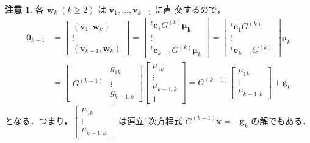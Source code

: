 \documentclass[11pt, uplatex, dvipdfmx]{jsarticle}
\theoremstyle{definition}
\newtheorem*{remark}{注意}
\begin{document}
\begin{remark}
  各 $\bm{w}_k \; (k \geq 2)$ は $\bm{v}_1, \ldots, \bm{v}_{k-1}$ に直
  交するので，
  \[
    \begin{aligned}
      \bm{0}_{k-1} &= \left[
        \begin{array}{c}
          (\bm{v}_1, \bm{w}_k)\\
          \vdots\\
          (\bm{v}_{k-1}, \bm{w}_k)
        \end{array}
      \right] = \left[
        \begin{array}{c}
          {}^{t}\bm{e}_1 G^{(k)} \bm{\mu_k}\\
          \vdots\\
          {}^{t} \bm{e}_{k-1} G^{(k)} \bm{\mu}_k
        \end{array}
      \right] = \left[
        \begin{array}{c}
          {}^{t}\bm{e}_1 G^{(k)}\\
          \vdots\\
          {}^{t}\bm{e}_{k-1}G^{(k)}
        \end{array}
      \right] \bm{\mu}_k\\
      &=\left[
        \begin{array}{cc}
          & g_{1k}\\
          G^{(k-1)} & \vdots \\
           & g_{k-1,k}
        \end{array}
      \right] \left[
        \begin{array}{c}
          \mu_{1k}\\
          \vdots\\
          \mu_{k-1,k}\\
          1
        \end{array}
      \right]
      = G^{(k-1)} \left[
        \begin{array}{c}
          \mu_{1k}\\
          \vdots \\
          \mu_{k-1,k}
        \end{array}
        \right] + \bm{g}_k
    \end{aligned}
  \]
  となる．つまり，$\left[
    \begin{array}{c}
      \mu_{1k}\\
      \vdots\\
      \mu_{k-1,k}
    \end{array}
    \right]$ は連立1次方程式 $G^{(k-1)} \bm{x} = -\bm{g}_k$ の解でもある．
\end{remark}
\end{document}
